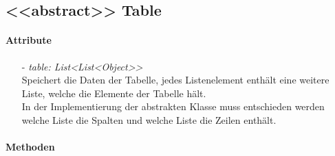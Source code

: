 \subsection*{<{<abstract>}> Table} \label{Table}

\paragraph{Attribute}

\begin{itemize}
	\item[-] \textit{table: List{<List<Object>}>} \\
	Speichert die Daten der Tabelle, jedes Listenelement enthält eine weitere Liste, welche die Elemente der Tabelle hält. \\
	In der Implementierung der abstrakten Klasse muss entschieden werden welche Liste die Spalten und welche Liste die Zeilen enthält.\\
\end{itemize}

\paragraph{Methoden}

